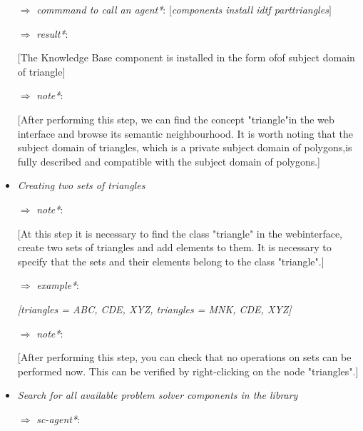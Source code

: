 \documentclass[10pt, a4paper]{article}
\begin{document}
\begin{multicols}{2}
\begin{itemize}
\vspace{-0.1cm}[ScComponentManagerInstallAgent]
\vspace{-0.2cm}\item [ $\Rightarrow$]\textit{commmand to call an agent*}:
\textit{$[$components install \textendash \textendash idtf
part\textunderscore triangles$]$}
\vspace{-0.2cm}\item [ $\Rightarrow$]\textit{result*}:


[The Knowledge Base component
is installed in the form ofof subject domain of triangle]


\itemindent 0.3cm 
\vspace{-0.2cm}\item [ $\Rightarrow$]\textit{note*}:


[After performing this step, we can find the concept "triangle"in the web interface and browse its semantic neighbourhood. It is worth noting that the subject domain of triangles, which is a private subject domain of polygons,is fully described and compatible with the subject domain of polygons.]
 \vspace{-0.2cm}   \item \textit{Creating two sets of triangles}
\itemindent 0.3cm \vspace{-0.2cm}\item [ $\Rightarrow$]\textit{note*}:


[At this step it is necessary to find the class "triangle" in the webinterface, create two sets of triangles and add elements to them.
\setcounter{page}{60}
It is necessary to specify that the sets and their elements belong to the class "triangle".]
\vspace{-0.2cm}\item [ $\Rightarrow$]\textit{example*}:


\vspace{-0.1cm}\textit{[triangles = {ABC, CDE, XYZ},
triangles = {MNK, CDE, XYZ}]}
\vspace{-0.3cm}\item [ $\Rightarrow$]\textit{note*}:


[After performing this step, you can check that no operations on sets can be performed now. This can be verified by right-clicking on the node "triangles".]
\itemindent 0cm  \vspace{-0.2cm}   \item \textit{Search for all available problem solver components in the library} 
\itemindent 0.3cm \vspace{-0.3cm}\item [ $\Rightarrow$]\textit{sc-agent*}:



\end{itemize}
\end{multicols}
\end{document}
